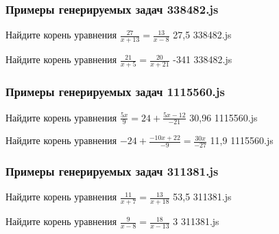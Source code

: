 \subsubsection*{Примеры генерируемых задач 338482.js}   

\par{Найдите корень уравнения $\frac{27}{x+13}=\frac{13}{x−8}$ }{ 27,5 }{338482.js}
\par{Найдите корень уравнения $\frac{21}{x+5}=\frac{20}{x+21}$ }{ -341 }{338482.js}


\subsubsection*{Примеры генерируемых задач 1115560.js}   

\par{Найдите корень уравнения $\frac{5x}{9}=24+\frac{5x−12}{−21}$ }{ 30,96 }{1115560.js}
\par{Найдите корень уравнения $-24+\frac{−10x+22}{−9}=\frac{30x}{−27}$ }{ 11,9 }{1115560.js}


\subsubsection*{Примеры генерируемых задач 311381.js}   

\par{Найдите корень уравнения $\frac{11}{x+7}=\frac{13}{x+18}$ }{ 53,5 }{311381.js}
\par{Найдите корень уравнения $\frac{9}{x−8}=\frac{18}{x−13}$ }{ 3 }{311381.js}
